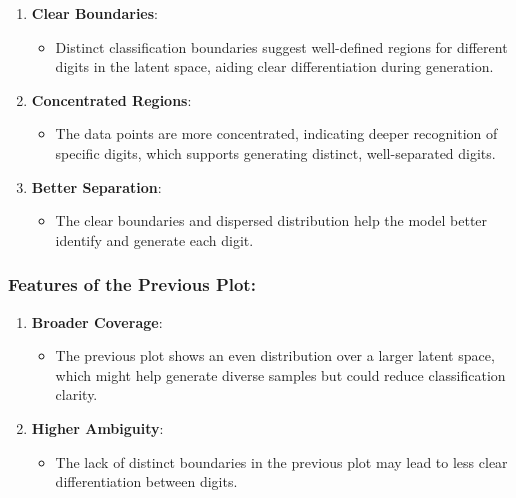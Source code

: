 \documentclass[11pt]{article}
\providecommand{\tightlist}{%
      \setlength{\itemsep}{0pt}\setlength{\parskip}{0pt}}
\begin{document}
\begin{enumerate}
\def\labelenumi{\arabic{enumi}.}
\tightlist
\item
  \textbf{Clear Boundaries}:

  \begin{itemize}
  \tightlist
  \item
    Distinct classification boundaries suggest well-defined regions for
    different digits in the latent space, aiding clear differentiation
    during generation.
  \end{itemize}
\item
  \textbf{Concentrated Regions}:

  \begin{itemize}
  \tightlist
  \item
    The data points are more concentrated, indicating deeper recognition
    of specific digits, which supports generating distinct,
    well-separated digits.
  \end{itemize}
\item
  \textbf{Better Separation}:

  \begin{itemize}
  \tightlist
  \item
    The clear boundaries and dispersed distribution help the model
    better identify and generate each digit.
  \end{itemize}
\end{enumerate}

\subsubsection{Features of the Previous
Plot:}\label{features-of-the-previous-plot}

\begin{enumerate}
\def\labelenumi{\arabic{enumi}.}
\tightlist
\item
  \textbf{Broader Coverage}:

  \begin{itemize}
  \tightlist
  \item
    The previous plot shows an even distribution over a larger latent
    space, which might help generate diverse samples but could reduce
    classification clarity.
  \end{itemize}
\item
  \textbf{Higher Ambiguity}:

  \begin{itemize}
  \tightlist
  \item
    The lack of distinct boundaries in the previous plot may lead to
    less clear differentiation between digits.
  \end{itemize}
\end{enumerate}
\end{document}
